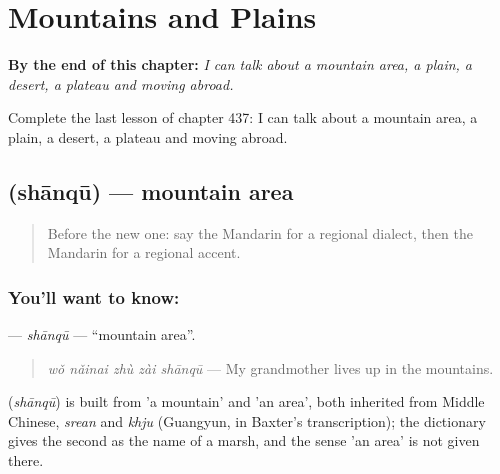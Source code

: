 
\chapter{Mountains and Plains}
\label{ch:zh-mountains-and-plains}

\begin{chapteropening}
\textbf{By the end of this chapter:} \emph{I can talk about a mountain area, a plain, a desert, a plateau and moving abroad.}

Complete the last lesson of chapter 437: I can talk about a mountain area, a plain, a desert, a plateau and moving abroad.
\end{chapteropening}

\section[\texorpdfstring{\zh{山区} (shānqū)}{山区 (shānqū)}]{ (shānqū) — mountain area}

\label{lesson:ZH-C437-shanqu}



\begin{quote}
Before the new one: say the Mandarin for a regional dialect, then the Mandarin for a regional accent.
\end{quote}

\subsection*{You'll want to know: }
\textbf{} — \emph{shānqū} — \textquotedblleft{}mountain area\textquotedblright{}.

\begin{quote}
\emph{wǒ nǎinai zhù zài shānqū} — My grandmother lives up in the mountains.
\end{quote}

\begin{cousinweb}
\textbf{} (\emph{shānqū}) is built from  'a mountain' and  'an area', both inherited from Middle Chinese, \emph{srean} and \emph{khju} (Guangyun, in Baxter's transcription); the dictionary gives the second as the name of a marsh, and the sense 'an area' is not given there.
\end{cousinweb}

